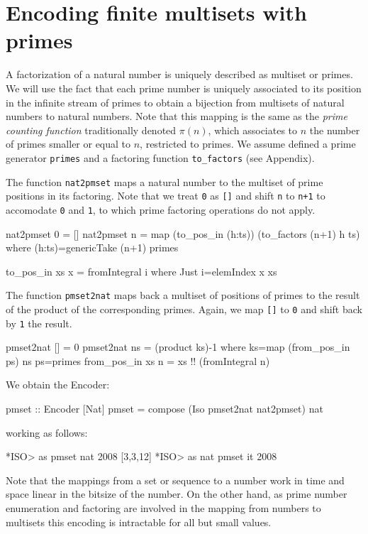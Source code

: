 \documentclass[]{INCLUDES/llncs}
\begin{document}
\section{Encoding finite multisets with primes} \label{pmset}

A factorization of a natural number is uniquely
described as multiset or primes. We will use the fact that each prime number 
is uniquely associated to its position in the infinite stream of primes
to obtain a bijection from multisets of natural numbers to natural numbers.
Note that this mapping is the same as the {\em prime counting function}
traditionally denoted $\pi(n)$, which associates to $n$ the number of primes
smaller or equal to $n$, restricted to primes. 
We assume defined a prime generator {\tt primes} and a factoring function
{\tt to\_factors} (see Appendix).

The function {\tt nat2pmset} maps a natural number to the multiset of prime
positions in its factoring. Note that we treat {\tt 0} as {\tt []} and shift
{\tt n} to {\tt n+1} to accomodate {\tt 0} and {\tt 1}, to which prime factoring
operations do not apply.
\begin{code}
nat2pmset 0 = []
nat2pmset n = map (to_pos_in (h:ts)) (to_factors (n+1) h ts) where
  (h:ts)=genericTake (n+1) primes
  
to_pos_in xs x = fromIntegral i where Just i=elemIndex x xs
\end{code}
The function {\tt pmset2nat} maps back a multiset of positions of primes to
the result of the product of the corresponding primes. Again, we map {\tt []} to
{\tt 0} and shift back by {\tt 1} the result.
\begin{code}
pmset2nat [] = 0
pmset2nat ns = (product ks)-1 where
  ks=map (from_pos_in ps) ns
  ps=primes
  from_pos_in xs n = xs !! (fromIntegral n)
\end{code}
We obtain the Encoder:
\begin{code}
pmset :: Encoder [Nat]
pmset = compose (Iso pmset2nat nat2pmset) nat
\end{code}
working as follows:
\begin{codex}
*ISO> as pmset nat 2008
[3,3,12]
*ISO> as nat pmset it
2008
\end{codex}
Note that the mappings from a set or sequence to a number work in time and
space linear in the bitsize of the number. On the other hand, as prime number
enumeration and factoring are involved in the mapping from numbers to multisets
this encoding is intractable for all but small values.
\end{document}
